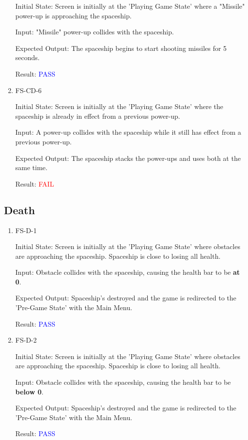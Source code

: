 \documentclass[12pt, titlepage]{article}
\begin{document}
\begin{enumerate}
Initial State: Screen is initially at the 'Playing Game State' where a "Missile" power-up is approaching the spaceship.
					
Input: "Missile" power-up collides with the spaceship.  
					
Expected Output: The spaceship begins to start shooting missiles for 5 seconds.
					
Result: \textcolor{blue}{PASS} 

\item{FS-CD-6\\}
					
Initial State: Screen is initially at the 'Playing Game State' where the spaceship is already in effect from a previous power-up.
					
Input: A power-up collides with the spaceship while it still has effect from a previous power-up.
					
Expected Output: The spaceship stacks the power-ups and uses both at the same time.
					
Result: \textcolor{red}{FAIL} 

\end{enumerate}

\subsection{Death}

\begin{enumerate}

\item{FS-D-1\\}

Initial State: Screen is initially at the 'Playing Game State' where obstacles are approaching the spaceship. Spaceship is close to losing all health.
					
Input: Obstacle collides with the spaceship, causing the health bar to be \textbf{at 0}. 
					
Expected Output: Spaceship's destroyed and the game is redirected to the 'Pre-Game State' with the Main Menu.
					
Result: \textcolor{blue}{PASS} 

\item{FS-D-2\\}

Initial State: Screen is initially at the 'Playing Game State' where obstacles are approaching the spaceship. Spaceship is close to losing all health.
					
Input: Obstacle collides with the spaceship, causing the health bar to be \textbf{below 0}. 
					
Expected Output: Spaceship's destroyed and the game is redirected to the 'Pre-Game State' with the Main Menu.
					
Result: \textcolor{blue}{PASS} 
					
\end{enumerate}
\end{document}
